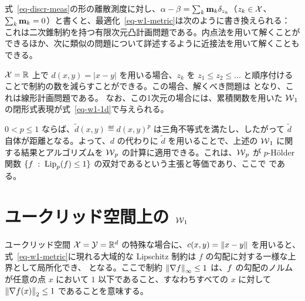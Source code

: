 式~\eqref{eq-discr-meas}の形の離散測度に対し、$\alpha-\beta = \sum_{k} \mathrm{\textbf{m}}_k \delta_{z_k}$（$z_k \in \mathcal{X}$、$\sum_k \mathrm{\textbf{m}}_k=0$）と書くと、最適化~\eqref{eq-w1-metric}は次のように書き換えられる：
これは二次錐制約を持つ有限次元凸計画問題である。内点法を用いて解くことができるほか、次に類似の問題について詳述するように近接法を用いて解くこともできる。

$\mathcal{X}=\mathbb{R}$ 上で $d(x,y)=|x-y|$ を用いる場合、$z_k$ を $z_1 \leq z_2 \leq \ldots$ と順序付けることで制約の数を減らすことができる。この場合、解くべき問題は
となり、これは線形計画問題である。
なお、この1次元の場合には、累積関数を用いた $\operatorname{\mathcal{W}}_1$ の閉形式表現が式~\eqref{eq-w1-1d}で与えられる。

\begin{rem}
	$0<p \leq 1$ ならば、$\tilde d(x,y) \eqdef d(x,y)^p$ は三角不等式を満たし、したがって $\tilde d$ 自体が距離となる。よって、$d$ の代わりに $\tilde d$ を用いることで、上述の $\operatorname{\mathcal{W}}_1$ に関する結果とアルゴリズムを $\operatorname{\mathcal{W}}_p$ の計算に適用できる。これは、$\operatorname{\mathcal{W}}_p$ が $p$-H\"older 関数 $\{ f \;:\; \operatorname{Lip}_p(f) \leq 1 \}$ の双対であるという主張と等価であり、ここで
	である。
\end{rem}

\section{ユークリッド空間上の $\operatorname{\mathcal{W}}_1$}
\label{sec-w1-eucl}


ユークリッド空間 $\mathcal{X}=\mathcal{Y}=\mathbb{R}^d$ の特殊な場合に、$c(x,y) = \left\| x-y \right\|$ を用いると、式~\eqref{eq-w1-metric}に現れる大域的な Lipschitz 制約は $f$ の勾配に対する一様な上界として局所化でき、
となる。ここで制約 $\left\| \nabla f \right\|_\infty \leq 1$ は、$f$ の勾配のノルムが任意の点 $x$ において $1$ 以下であること、すなわちすべての $x$ に対して $\left\| \nabla f(x) \right\|_2 \leq 1$ であることを意味する。

